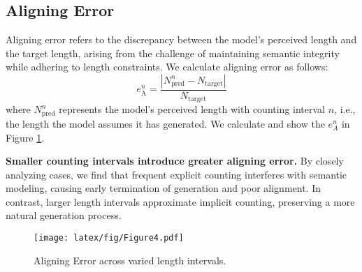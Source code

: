 \subsection{Aligning Error}  
\label{sec:aligning_error}
Aligning error refers to the discrepancy between the model’s perceived length and the target length, arising from the challenge of maintaining semantic integrity while adhering to length constraints. We calculate aligning error as follows:  
\begin{equation}
e^n_{\text{A}} = \frac{|N^n_{\mathrm{pred}} - N_{\mathrm{target}}|}{N_{\mathrm{target}}} 
\label{eq:e4}
\end{equation}
where \( N^n_{\mathrm{pred}} \) represents the model’s perceived length with counting interval $n$, i.e., the length the model assumes it has generated. 
We calculate and show the $e_A^{n}$ in Figure \ref{fig:Figure4}.
% 



\begin{finding}
\label{find7}
\textbf{Smaller counting intervals introduce greater aligning error.}
By closely analyzing cases, we find that frequent explicit counting interferes with semantic modeling, causing early termination of generation and poor alignment. In contrast, larger length intervals approximate implicit counting, preserving a more natural generation process.
\end{finding}

\begin{figure}[ht]
  \texttt{[image: latex/fig/Figure4.pdf]}
  \vspace{-20pt}
  \caption{Aligning Error across varied length intervals.}
  \vspace{-12pt}
  \label{fig:Figure4}
\end{figure}

\vspace{-4pt}
